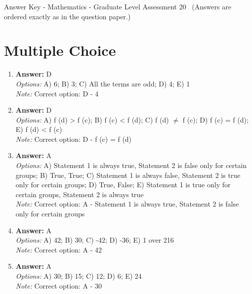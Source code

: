 \documentclass[12pt]{article}
\begin{document}
\begin{center}
Answer Key - Mathematics - Graduate Level Assessment 20 \
\small (Answers are ordered exactly as in the question paper.)
\end{center}

\section*{Multiple Choice}
\begin{enumerate}[label=\arabic*.]
\item \textbf{Answer:} D
\\ \textit{Options:} A) 6; B) 3; C) All the terms are odd; D) 4; E) 1
\\ \textit{Note:} Correct option: D - 4
\item \textbf{Answer:} D
\\ \textit{Options:} A) f (d) \textgreater{} f (c); B) f (c) \textless{} f (d); C) f (d) \ensuremath{\neq} f (c); D) f (c) = f (d); E) f (d) \textless{} f (c)
\\ \textit{Note:} Correct option: D - f (c) = f (d)
\item \textbf{Answer:} A
\\ \textit{Options:} A) Statement 1 is always true, Statement 2 is false only for certain groups; B) True, True; C) Statement 1 is always false, Statement 2 is true only for certain groups; D) True, False; E) Statement 1 is true only for certain groups, Statement 2 is always true
\\ \textit{Note:} Correct option: A - Statement 1 is always true, Statement 2 is false only for certain groups
\item \textbf{Answer:} A
\\ \textit{Options:} A) 42; B) 30; C) -42; D) -36; E) 1 over 216
\\ \textit{Note:} Correct option: A - 42
\item \textbf{Answer:} A
\\ \textit{Options:} A) 30; B) 15; C) 12; D) 6; E) 24
\\ \textit{Note:} Correct option: A - 30
\end{enumerate}
\end{document}
